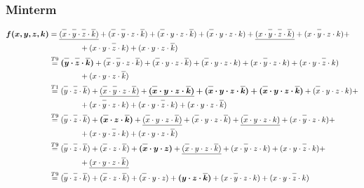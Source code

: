 \documentclass{article}
\newcommand*{\oline}[1]{\overline{#1\mathstrut}}
\newcommand{\bigspace}{\quad\quad\quad\quad}
\begin{document}
\subsubsection*{Minterm}
\begin{align*}
  \bm{f(x,y,z,k)} &= \underline{(\oline{x} \cdot \oline{y} \cdot \oline{z} \cdot \oline{k})} + (\oline{x} \cdot \oline{y} \cdot z \cdot \oline{k}) + (\oline{x} \cdot y \cdot z \cdot \oline{k}) + (\oline{x} \cdot y \cdot z \cdot k) + \underline{(x \cdot \oline{y} \cdot \oline{z} \cdot \oline{k})} + (x \cdot \oline{y} \cdot z \cdot k) + \\
  &\bigspace + (x \cdot y \cdot \oline{z} \cdot k) + (x \cdot y \cdot z \cdot \oline{k})\\
  &\overset{T9}{=} \bm{(\oline{y} \cdot \oline{z} \cdot \oline{k})} + (\oline{x} \cdot \oline{y} \cdot z \cdot \oline{k}) + (\oline{x} \cdot y \cdot z \cdot \oline{k}) + (\oline{x} \cdot y \cdot z \cdot k) + (x \cdot \oline{y} \cdot z \cdot k) + (x \cdot y \cdot \oline{z} \cdot k)\\
  &\bigspace + (x \cdot y \cdot z \cdot \oline{k})\\
  &\overset{T1}{=} (\oline{y} \cdot \oline{z} \cdot \oline{k}) + \underline{(\oline{x} \cdot \oline{y} \cdot z \cdot \oline{k})} + \bm{\underline{(\oline{x} \cdot y \cdot z \cdot \oline{k})} + (\oline{x} \cdot y \cdot z \cdot \oline{k}) + (\oline{x} \cdot y \cdot z \cdot \oline{k})} + (\oline{x} \cdot y \cdot z \cdot k) + \\
  &\bigspace + (x \cdot \oline{y} \cdot z \cdot k) + (x \cdot y \cdot \oline{z} \cdot k) + (x \cdot y \cdot z \cdot \oline{k})\\
  &\overset{T9}{=} (\oline{y} \cdot \oline{z} \cdot \oline{k}) + \bm{(\oline{x} \cdot z \cdot \oline{k})} + \underline{(\oline{x} \cdot y \cdot z \cdot \oline{k})} + (\oline{x} \cdot y \cdot z \cdot \oline{k}) + \underline{(\oline{x} \cdot y \cdot z \cdot k)} + (x \cdot \oline{y} \cdot z \cdot k) + \\
  &\bigspace + (x \cdot y \cdot \oline{z} \cdot k) + (x \cdot y \cdot z \cdot \oline{k})\\
  &\overset{T9}{=} (\oline{y} \cdot \oline{z} \cdot \oline{k}) + (\oline{x} \cdot z \cdot \oline{k}) + \bm{(\oline{x} \cdot y \cdot z)} + \underline{(\oline{x} \cdot y \cdot z \cdot \oline{k})} + (x \cdot \oline{y} \cdot z \cdot k) + (x \cdot y \cdot \oline{z} \cdot k) + \\
  &\bigspace + \underline{(x \cdot y \cdot z \cdot \oline{k})}\\
  &\overset{T9}{=} (\oline{y} \cdot \oline{z} \cdot \oline{k}) + (\oline{x} \cdot z \cdot \oline{k}) + (\oline{x} \cdot y \cdot z) + \bm{(y \cdot z \cdot \oline{k})} + (x \cdot \oline{y} \cdot z \cdot k) + (x \cdot y \cdot \oline{z} \cdot k)
\end{align*}
\end{document}
